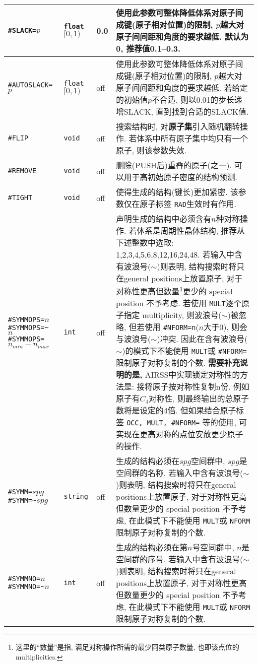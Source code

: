 \documentclass[a4paper, 10pt]{article}
\begin{document}
\begin{center}
\begin{longtable}{m{11em}|m{4em}<{\centering}|m{3em}<{\centering}|m{15em}}
\midrule
 \verb|#SLACK=|\(p\)& \verb|float| \([0,1)\) & 0.0 & 使用此参数可整体降低体系对原子间成键(原子相对位置)的限制, \(p\)越大对原子间间距和角度的要求越低. 默认为0, 推荐值0.1--0.3.\\
\midrule
 \verb|#AUTOSLACK=|\(p\)& \verb|float| \([0,1)\) & off & 使用此参数可整体降低体系对原子间成键(原子相对位置)的限制, \(p\)越大对原子间间距和角度的要求越低. 若给定的初始值\(p\)不合适, 则以0.01的步长递增SLACK, 直到找到合适的SLACK值.\\
\midrule
 \verb|#FLIP|& \verb|void| & off & 搜索结构时, 对\textbf{原子集}引入随机翻转操作. 若体系中所有原子集中均只有一个原子, 则该参数失效.\\
\midrule
 \verb|#REMOVE|& \verb|void| & off & 删除(PUSH后)重叠的原子(之一). 可以用于高初始原子密度的结构预测.\\
\midrule
 \verb|#TIGHT|& \verb|void| & off & 使得生成的结构(键长)更加紧密. 该参数仅在原子标签 \verb|RAD|生效时有作用.\\
\midrule
 \verb|#SYMMOPS=|\(n\)\hspace{6em} \verb|#SYMMOPS=~|\(n\;\;\;\;\;\;\;\;\;\;\;\)\hspace{6em} \verb|#SYMMOPS=|\(n_{min}-n_{max}\) & \verb|int| &  off & 声明生成的结构中必须含有\(n\)种对称操作. 若体系是周期性晶体结构, 推荐从下述整数中选取: 1,2,3,4,5,6,8,12,16,24,48. 若输入中含有波浪号(\(\sim\))则表明, 结构搜索时将只在general positions上放置原子, 对于对称性更高但数量\footnote{这里的``数量''是指, 满足对称操作所需的最少同类原子数量, 也即该点位的 multiplicities. }更少的 special position 不予考虑. 若使用 \verb|MULT|逐个原子指定 multiplicity, 则波浪号(\(\sim\))被忽略, 但若使用 \verb|#NFORM=n|(\(n\)大于0), 则会与波浪号(\(\sim\))冲突. 因此在含有波浪号(\(\sim\))的模式下不能使用 \verb|MULT|或 \verb|#NFORM=|限制原子对称复制的个数. \textbf{需要补充说明的是,} AIRSS中实现锁定对称性的方法是: 接将原子按对称性复制n份. 例如原子有\(C_4\)对称性, 则最终输出的总原子数将是设定的4倍. 但如果结合原子标签 \verb|OCC, MULT, #NFORM=| 等的使用, 可实现在更高对称的点位安放更少原子的操作. \\
\midrule
 \verb|#SYMM=|\(spg\)\hspace{6em} \verb|#SYMM=~|\(spg\)& \verb|string| & off & 生成的结构必须在\(spg\)空间群中, \(spg\)是空间群的名称. 若输入中含有波浪号(\(\sim\))则表明, 结构搜索时将只在general positions上放置原子, 对于对称性更高但数量更少的 special position 不予考虑, 在此模式下不能使用 \verb|MULT|或 \verb|NFORM|限制原子对称复制的个数.\\
\midrule
 \verb|#SYMMNO=|\(n\)\hspace{6em} \verb|#SYMMNO=~|\(n\) & \verb|int| & off & 生成的结构必须在第\(n\)号空间群中, \(n\)是空间群的序号. 若输入中含有波浪号(\(\sim\))则表明, 结构搜索时将只在general positions上放置原子, 对于对称性更高但数量更少的 special position 不予考虑, 在此模式下不能使用 \verb|MULT|或 \verb|NFORM|限制原子对称复制的个数.\\

\end{longtable}
\end{center}
\end{document}

